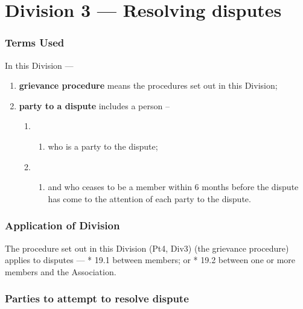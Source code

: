 \hypertarget{division-3-resolving-disputes}{%
\part*{Division 3 --- Resolving disputes}\label{division-3-resolving-disputes}}

\hypertarget{terms-used}{%
\section{Terms Used}\label{terms-used}}

In this Division ---

\begin{enumerate}

\item \textbf{grievance procedure} means the procedures set out in this Division;
\item \textbf{party to a dispute} includes a person --

  \begin{enumerate}
  \item \begin{enumerate}
    \def\labelenumi{\alph{enumi})}
    
    \item who is a party to the dispute;
    \end{enumerate}
  \item \begin{enumerate}
    \def\labelenumi{\alph{enumi})}
    \setcounter{enumi}{1}
    
    \item and who ceases to be a member within 6 months before the dispute has come to the attention of each party to the dispute.
    \end{enumerate}
  \end{enumerate}
\end{enumerate}

\hypertarget{application-of-division}{%
\section{Application of Division}\label{application-of-division}}

The procedure set out in this Division (Pt4, Div3) (the grievance procedure) applies to disputes --- * 19.1 between members; or * 19.2 between one or more members and the Association.

\hypertarget{parties-to-attempt-to-resolve-dispute}{%
\section{Parties to attempt to resolve dispute}\label{parties-to-attempt-to-resolve-dispute}}

